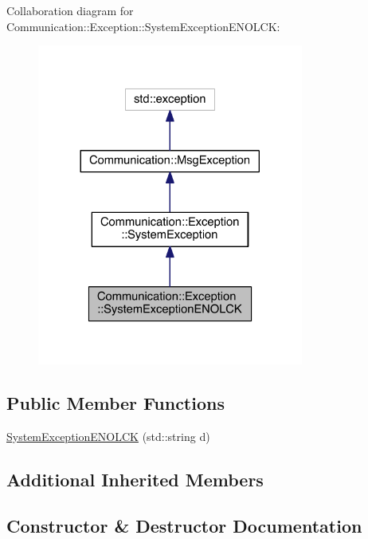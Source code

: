 Collaboration diagram for Communication\+:\+:Exception\+:\+:System\+Exception\+E\+N\+O\+L\+C\+K\+:\nopagebreak
\begin{figure}[H]
\begin{center}
\leavevmode
\includegraphics[width=248pt]{class_communication_1_1_exception_1_1_system_exception_e_n_o_l_c_k__coll__graph}
\end{center}
\end{figure}
\subsection*{Public Member Functions}
\begin{DoxyCompactItemize}
\item 
\hyperlink{class_communication_1_1_exception_1_1_system_exception_e_n_o_l_c_k_acefa5f6a86b2b05bfd914e35d58032c7}{System\+Exception\+E\+N\+O\+L\+C\+K} (std\+::string d)
\end{DoxyCompactItemize}
\subsection*{Additional Inherited Members}


\subsection{Constructor \& Destructor Documentation}
\hypertarget{class_communication_1_1_exception_1_1_system_exception_e_n_o_l_c_k_acefa5f6a86b2b05bfd914e35d58032c7}{}
